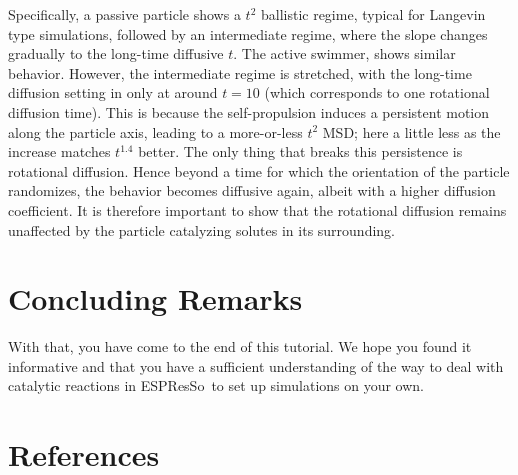 \documentclass[aip,jcp,reprint,a4paper,onecolumn,nofootinbib,amsmath,amssymb]{revtex4-1}
\newcommand{\es}{\mbox{\textsf{ESPResSo}}\xspace}
\begin{document}
Specifically, a passive particle shows a $t^{2}$ ballistic regime, typical for Langevin type simulations, followed by an intermediate regime, where the slope changes gradually to the long-time diffusive $t$. The active swimmer, shows similar behavior. However, the intermediate regime is stretched, with the long-time diffusion setting in only at around $t = 10$ (which corresponds to one rotational diffusion time). This is because the self-propulsion induces a persistent motion along the particle axis, leading to a more-or-less $t^{2}$ MSD; here a little less as the increase matches $t^{1.4}$ better. The only thing that breaks this persistence is rotational diffusion. Hence beyond a time for which the orientation of the particle randomizes, the behavior becomes diffusive again, albeit with a higher diffusion coefficient. It is therefore important to show that the rotational diffusion remains unaffected by the particle catalyzing solutes in its surrounding.

\section{Concluding Remarks}

With that, you have come to the end of this tutorial. We hope you found it informative and that you have a sufficient understanding of the way to deal with catalytic reactions in \es\ to set up simulations on your own.

\section*{References}



\end{document}
